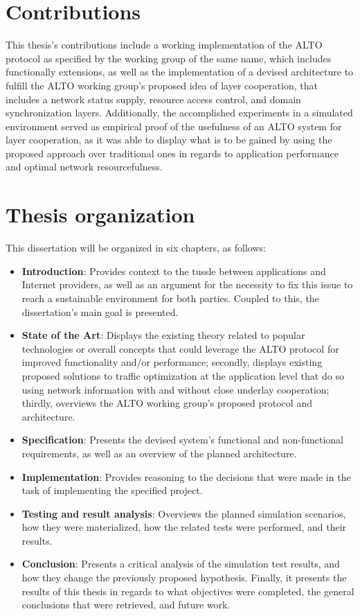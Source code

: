 \section{Contributions}

    This thesis's contributions include a working implementation of the ALTO protocol as specified by the working group of the same name, which includes functionally extensions, as well as the implementation of a devised architecture to fulfill the ALTO working group's proposed idea of layer cooperation, that includes a network status supply, resource access control, and domain synchronization layers.
    Additionally, the accomplished experiments in a simulated environment served as empirical proof of the usefulness of an ALTO system for layer cooperation, as it was able to display what is to be gained by using the proposed approach over traditional ones in regards to application performance and optimal network resourcefulness.

\section{Thesis organization}

    This dissertation will be organized in six chapters, as follows:

\begin{itemize}
    \item \textbf{Introduction}: Provides context to the tussle between applications and Internet providers, as well as an argument for the necessity to fix this issue to reach a sustainable environment for both parties. Coupled to this, the dissertation's main goal is presented.
    \item \textbf{State of the Art}: Displays the existing theory related to popular technologies or overall concepts that could leverage the ALTO protocol for improved functionality and/or performance; secondly, displays existing proposed solutions to traffic optimization at the application level that do so using network information with and without close underlay cooperation; thirdly, overviews the ALTO working group's proposed protocol and architecture.
    \item \textbf{Specification}: Presents the devised system's functional and non-functional requirements, as well as an overview of the planned architecture.
    \item \textbf{Implementation}: Provides reasoning to the decisions that were made in the task of implementing the specified project.
    \item \textbf{Testing and result analysis}: Overviews the planned simulation scenarios, how they were materialized, how the related tests were performed, and their results.
    \item \textbf{Conclusion}: Presents a critical analysis of the simulation test results, and how they change the previously proposed hypothesis. Finally, it presents the results of this thesis in regards to what objectives were completed, the general conclusions that were retrieved, and future work.
\end{itemize}{}

